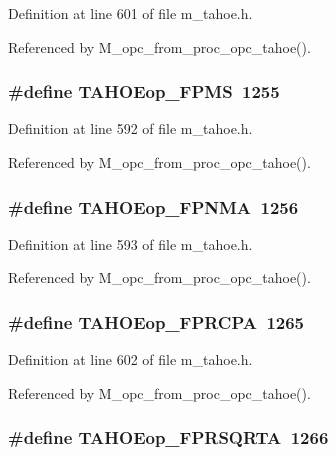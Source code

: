 Definition at line 601 of file m\_\-tahoe.h.

Referenced by M\_\-opc\_\-from\_\-proc\_\-opc\_\-tahoe().
\subsubsection{\setlength{\rightskip}{0pt plus 5cm}\#define TAHOEop\_\-FPMS~1255}\label{m__tahoe_8h_a0e393a70123c111589dd031cf61bcdb}




Definition at line 592 of file m\_\-tahoe.h.

Referenced by M\_\-opc\_\-from\_\-proc\_\-opc\_\-tahoe().
\subsubsection{\setlength{\rightskip}{0pt plus 5cm}\#define TAHOEop\_\-FPNMA~1256}\label{m__tahoe_8h_88f9fa7425efd6855ef1e7f237bf39c7}




Definition at line 593 of file m\_\-tahoe.h.

Referenced by M\_\-opc\_\-from\_\-proc\_\-opc\_\-tahoe().
\subsubsection{\setlength{\rightskip}{0pt plus 5cm}\#define TAHOEop\_\-FPRCPA~1265}\label{m__tahoe_8h_96afb81dbb2c765f1c465752c0d63228}




Definition at line 602 of file m\_\-tahoe.h.

Referenced by M\_\-opc\_\-from\_\-proc\_\-opc\_\-tahoe().
\subsubsection{\setlength{\rightskip}{0pt plus 5cm}\#define TAHOEop\_\-FPRSQRTA~1266}\label{m__tahoe_8h_02ae2e2827a769cfa0ac4849b44acfdd}




